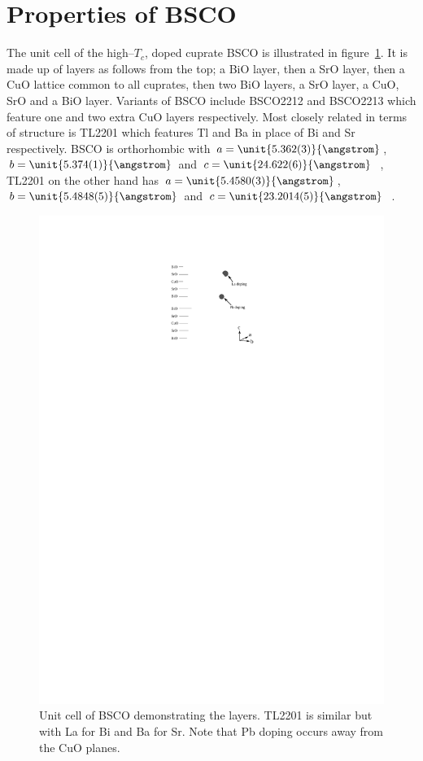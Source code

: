 
\section{Properties of \acs{BSCO}}
\label{Sec:Intro:PropertiesBSCO}

The unit cell of the high--$T_c$, doped cuprate \acf{BSCO} is illustrated in figure~\ref{Fig:Intro:BSCOUnitCell}. It is made up of layers as follows from the top; a BiO layer, then a SrO layer, then a CuO lattice common to all cuprates, then two BiO layers, a SrO layer, a CuO, SrO and a BiO layer. Variants of \acs{BSCO} include \ac{BSCO2212} and \ac{BSCO2213} which feature one and two extra CuO layers respectively. Most closely related in terms of structure is \acs{TL2201} which features Tl and Ba in place of Bi and Sr respectively. \ac{BSCO} is orthorhombic with $a=\unit{5.362(3)}{\angstrom}$, $b=\unit{5.374(1)}{\angstrom}$ and $c=\unit{24.622(6)}{\angstrom}$~\cite{Torardi1988}, \ac{TL2201} on the other hand has $a=\unit{5.4580(3)}{\angstrom}$, $b=\unit{5.4848(5)}{\angstrom}$ and $c=\unit{23.2014(5)}{\angstrom}$~\cite{Peets2007}.
\begin{figure}[htbp]
    \begin{center}
        \includegraphics[scale=1.1]{Chapter-Introduction/Figures/BSCOUnitCell/BSCOUnitCell}
        \caption{Unit cell of \acs{BSCO} demonstrating the layers. \ac{TL2201} is similar but with La for Bi and Ba for Sr. Note that Pb doping occurs away from the CuO planes.}
        \label{Fig:Intro:BSCOUnitCell}
    \end{center}
\end{figure}
